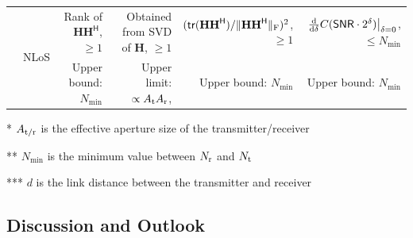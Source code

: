 \documentclass[journal]{IEEEtran}
\theoremstyle{definition}
\begin{document}
\begin{table}[!t]
\begin{threeparttable}
{\begin{tabular}{|ll|r|rrr|}
\multicolumn{1}{|l|}{}                                                                             & \multirow{2}{*}{NLoS} & Rank of $\mathbf{H}{\mathbf{H}}^{\mathsf{H}}$, $\geq1$                                                                                    & \multicolumn{1}{r|}{Obtained from SVD of $\mathbf{H}$, $\geq1$}                                                                                & \multicolumn{1}{r|}{$({\mathsf{tr}}({\mathbf{HH}}^{\mathsf{H}})/\lVert{\mathbf{HH}}^{\mathsf{H}}\rVert_{\rm{F}})^2$, $\geq1$}                                                                                        & $\left.\frac{{\rm{d}}}{{\rm{d}}\delta}C({\mathsf{SNR}}\cdot2^{\delta})\right|_{\delta=0}$, $\leq N_{\min}$                                                                         \\ \cline{3-6}
\multicolumn{1}{|l|}{}                                                                             &                       & Upper bound: $N_{\min}$                                                                           & \multicolumn{1}{r|}{Upper limit: $\propto A_{\rm{t}}A_{\rm{r}}$, \cite{Poon2005,Pizzo2023}}                                                                   & \multicolumn{1}{r|}{Upper bound: $N_{\min}$}                                                                             & Upper bound: $N_{\min}$                                                            \\ \hline
\end{tabular}}
\begin{tablenotes}
\footnotesize
\item[*] $A_{{\rm{t}}/{\rm{r}}}$ is the effective aperture size of the transmitter/receiver
\item[**] $N_{\min}$ is the minimum value between $N_{\rm{r}}$ and $N_{\rm{t}}$
\item[***] $d$ is the link distance between the transmitter and receiver
\end{tablenotes}
\end{threeparttable}
\end{table}

\subsection{Discussion and Outlook}
\end{document}
